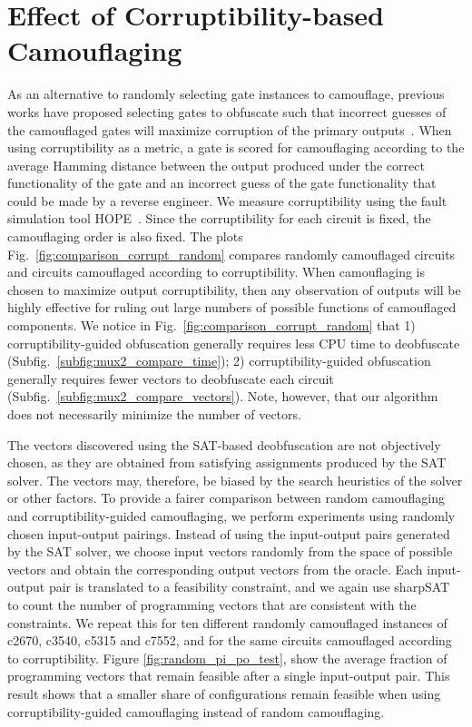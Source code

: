 \documentclass[proposal]{umassthesis}  %
\begin{document}
\section{Effect of Corruptibility-based Camouflaging}

As an alternative to randomly selecting gate instances to camouflage, previous works have proposed selecting gates to obfuscate such that incorrect guesses of the camouflaged gates will maximize corruption of the primary outputs~\cite{chakraborty-09,rajendran-13}. When using corruptibility as a metric, a gate is scored for camouflaging according to the average Hamming distance between the output produced under the correct functionality of the gate and an incorrect guess of the gate functionality that could be made by a reverse engineer. We measure corruptibility using the fault simulation tool HOPE~\cite{lee-96}. Since the corruptibility for each circuit is fixed, the camouflaging order is also fixed. The plots Fig.~\ref{fig:comparison_corrupt_random} compares randomly camouflaged circuits and circuits camouflaged according to corruptibility. When camouflaging is chosen to maximize output corruptibility, then any observation of outputs will be highly effective for ruling out large numbers of possible functions of camouflaged components. We notice in Fig.~\ref{fig:comparison_corrupt_random} that 1) corruptibility-guided obfuscation generally requires less CPU time to deobfuscate (Subfig.~\ref{subfig:mux2_compare_time}); 2) corruptibility-guided obfuscation generally requires fewer vectors to deobfuscate each circuit (Subfig.~\ref{subfig:mux2_compare_vectors}). Note, however, that our algorithm does not necessarily minimize the number of vectors.

The vectors discovered using the SAT-based deobfuscation are not objectively chosen, as they are obtained from satisfying assignments produced by the SAT solver. The vectors may, therefore, be biased by the search heuristics of the solver or other factors. To provide a fairer comparison between random camouflaging and corruptibility-guided camouflaging, we perform experiments using randomly chosen input-output pairings. Instead of using the input-output pairs generated by the SAT solver, we choose input vectors randomly from the space of possible vectors and obtain the corresponding output vectors from the oracle. Each input-output pair is translated to a feasibility constraint, and we again use sharpSAT to count the number of programming vectors that are consistent with the constraints. We repeat this for ten different randomly camouflaged instances of c2670, c3540, c5315 and c7552, and for the same circuits camouflaged according to corruptibility. Figure \ref{fig:random_pi_po_test}, show the average fraction of programming vectors that remain feasible after a single input-output pair. This result shows that a smaller share of configurations remain feasible when using corruptibility-guided camouflaging instead of random camouflaging.
\end{document}
